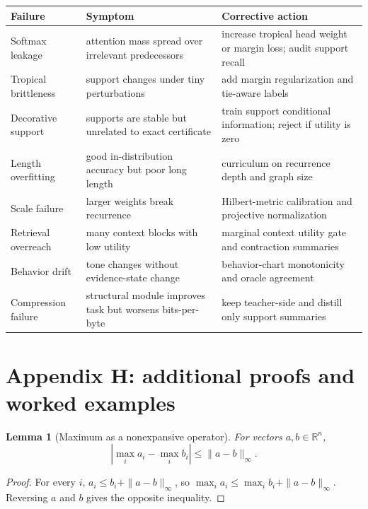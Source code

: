 \documentclass[11pt]{article}
\newtheorem{lemma}[definition]{Lemma}
\newcommand{\R}{\mathbb{R}}
\begin{document}
\begin{longtable}{p{}p{}p{}}
\toprule
Failure & Symptom & Corrective action\\
\midrule
Softmax leakage & attention mass spread over irrelevant predecessors & increase tropical head weight or margin loss; audit support recall\\
Tropical brittleness & support changes under tiny perturbations & add margin regularization and tie-aware labels\\
Decorative support & supports are stable but unrelated to exact certificate & train support conditional information; reject if utility is zero\\
Length overfitting & good in-distribution accuracy but poor long length & curriculum on recurrence depth and graph size\\
Scale failure & larger weights break recurrence & Hilbert-metric calibration and projective normalization\\
Retrieval overreach & many context blocks with low utility & marginal context utility gate and contraction summaries\\
Behavior drift & tone changes without evidence-state change & behavior-chart monotonicity and oracle agreement\\
Compression failure & structural module improves task but worsens bits-per-byte & keep teacher-side and distill only support summaries\\
\bottomrule
\end{longtable}

\newpage
\section{Appendix H: additional proofs and worked examples}

\begin{lemma}[Maximum as a nonexpansive operator]
For vectors $a,b\in\R^n$,
\begin{equation}
|\max_i a_i-\max_i b_i|\le \|a-b\|_\infty.
\end{equation}
\end{lemma}
\begin{proof}
For every $i$, $a_i\le b_i+\|a-b\|_\infty$, so $\max_i a_i\le \max_i b_i+\|a-b\|_\infty$. Reversing $a$ and $b$ gives the opposite inequality.
\end{proof}
\end{document}
